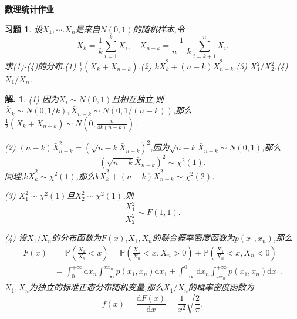 \documentclass[a4paper,oneside,12pt]{ctexart}
\theoremstyle{plain}
\newtheorem{exercise}{习题}
\theoremstyle{nonumberplain}
\newtheorem{solution}{解.}
\theoremstyle{nonumberplain}
\newcommand{\dif}{\mathrm{d}}
\newcommand{\prob}{\mathbb{P}}
\begin{document}
    \begin{center}
        \LARGE\bfseries
        数理统计作业
    \end{center}

    \begin{exercise}
        \label{ex:1}
        设$X_1,\cdots.X_n$是来自$N(0,1)$的随机样本,令 
    \begin{equation*}
        \bar{X}_k=\frac{1}{k}\sum_{i=1}^kX_i,\quad \bar{X}_{n-k}=\frac{1}{n-k}\sum_{i=k+1}^nX_i.
    \end{equation*}
    求(1)-(4)的分布.(1) $\frac{1}{2}(\bar{X}_k+\bar{X}_{n-k})$.(2) $k\bar{X}^2_k+(n-k)\bar{X}_{n-k}^2$.(3) $X_1^2/X_2^2$.(4) 
    $X_1/X_n$.
    \end{exercise}

    \begin{solution}
        (1) 因为$X_i\sim N(0,1)$且相互独立,则$\bar{X}_k\sim N(0,1/k),\bar{X}_{n-k}\sim N(0,1/(n-k))$,那么$\frac{1}{2}(\bar{X}_k+\bar{X}_{n-k})\sim N\left(0,\frac{n}{4k(n-k)}\right)$.

        (2) $(n-k)\bar{X}_{n-k}^2=\left(\sqrt{n-k}\bar{X}_{n-k}\right)^2$,因为$\sqrt{n-k}\bar{X}_{n-k}\sim N(0,1)$,那么
        \begin{equation*}
            \left(\sqrt{n-k}\bar{X}_{n-k}\right)^2\sim \chi^2(1).
        \end{equation*}
        同理,$k\bar{X}_k^2\sim \chi^2(1)$,那么$k\bar{X}_k^2+(n-k)\bar{X}_{n-k}^2\sim \chi^2(2)$.

        (3) $X_1^2\sim\chi^2(1)$且$X_2^2\sim\chi^2(1)$,则
        \begin{equation*}
            \frac{X_1^2}{X_2^2}\sim F(1,1).
        \end{equation*}

        (4) 设$X_1/X_n$的分布函数为$F(x)$,$X_1,X_n$的联合概率密度函数为$p(x_1,x_n)$,那么
        \begin{align*}
            F(x)&=\prob\left(\frac{X_1}{X_n}<x\right)=\prob\left(\frac{X_1}{X_n}<x,X_n>0\right)+\prob\left(\frac{X_1}{X_n}<x,X_n<0\right)\\
            &=\int_0^{+\infty}\dif x_n\int_{-\infty}^{xx_n}p(x_1,x_n)\dif x_1+\int_{-\infty}^0\dif x_n\int_{xx_n}^{+\infty}p(x_1,x_n)\dif x_1.
        \end{align*}
        $X_1,X_n$为独立的标准正态分布随机变量,那么$X_1/X_n$的概率密度函数为 
        \begin{equation*}
            f(x)=\frac{\dif F(x)}{\dif x}=\frac{1}{x^2}\sqrt{\frac{2}{\pi}}.
        \end{equation*}
    \end{solution}
\end{document}
